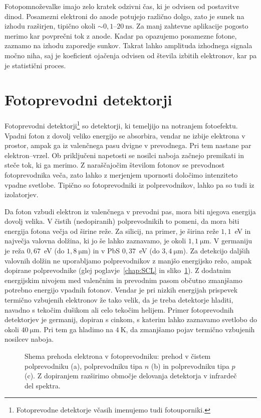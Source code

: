 Fotopomnoževalke imajo zelo kratek odzivni čas, ki je odvisen od postavitve dinod. Posamezni 
elektroni do anode potujejo različno dolgo, zato je sunek na izhodu 
razširjen, tipično okoli $\sim 0,1$--$20~\si{\nano\second}$.  
Za manj zahtevne aplikacije pogosto merimo kar povprečni tok z anode. Kadar pa opazujemo
posamezne fotone, zaznamo na izhodu zaporedje sunkov. Takrat lahko 
amplituda izhodnega signala močno niha, saj je koeficient ojačenja 
odvisen od števila izbitih elektronov, kar pa je statistični proces. 

\section{Fotoprevodni detektorji}
Fotoprevodni detektorji\footnote{Fotoprevodne detektorje včasih imenujemo tudi fotouporniki.} 
so detektorji, ki temeljijo na notranjem fotoefektu.
Vpadni foton z dovolj veliko energijo se absorbira, vendar ne izbije elektrona v prostor, 
ampak ga iz valenčnega pasu dvigne v prevodnega. Pri tem nastane par elektron--vrzel. 
Ob priključeni napetosti se nosilci naboja začnejo premikati in steče tok, 
ki ga merimo. Z naraščajočim številom fotonov se prevodnost fotoprevodnika veča, 
zato lahko z merjenjem upornosti določimo 
intenziteto vpadne svetlobe. Tipično so fotoprevodniki iz polprevodnikov, 
lahko pa so tudi iz izolatorjev. 

Da foton vzbudi elektron iz valenčnega v prevodni pas, mora biti njegova energija dovolj velika. 
V čistih (nedopiranih) polprevodnikih to pomeni, da mora biti energija fotona večja od 
širine reže. Za silicij, na primer, je širina reže $1,1$~eV in največja
valovna dolžina, ki jo še lahko zaznavamo, je okoli 
$1,1~\si{\micro\meter}$. V germaniju je reža $0,67$~eV (do $1,8~\si{\micro\meter}$) in v 
PbS $0,37$~eV (do $3,4~\si{\micro\meter}$). 
Za detekcijo daljših valovnih dolžin ne uporabljamo polprevodnikov
z manjšo energijsko režo, ampak dopirane polprevodnike (glej poglavje~\ref{chap:SCL} 
in sliko~\ref{fig:FPrevodnik}). 
Z dodatnim energijskim nivojem med valenčnim in prevodnim pasom občutno zmanjšamo 
potrebno energijo vpadnih fotonov. Vendar je pri  nizkih energijah prispevek termično 
vzbujenih elektronov že tako velik, da je treba detektorje hladiti, navadno s tekočim
dušikom ali celo tekočim helijem. Primer fotoprevodnih detektorjev je germanij, dopiran s cinkom, 
s katerim lahko zaznavamo svetlobo do okoli $40~\si{\micro\meter}$. Pri tem ga hladimo
na $4~\si{\kelvin}$, da zmanjšamo pojav termično vzbujenih nosilcev naboja. 
\begin{figure}[h]
\centering
\def\svgwidth{150truemm} 

\caption{Shema prehoda elektrona v fotoprevodniku: prehod v čistem polprevodniku (a), 
polprevodniku tipa $n$ (b) in polprevodniku tipa $p$ (c). 
Z dopiranjem razširimo območje delovanja detektorja v infrardeč del spektra. }
\label{fig:FPrevodnik}
\end{figure}


